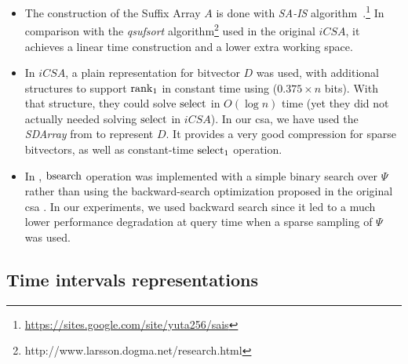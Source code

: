 	\begin{itemize}
		\item The construction of the Suffix Array $A$ is done with 
		{\em SA-IS} algorithm~\cite{nong2011two}.\footnote{\url{ https://sites.google.com/site/yuta256/sais}} 
		In comparison with the  {\em qsufsort} algorithm\footnote{
			http://www.larsson.dogma.net/research.html}
		\cite{Larsson:2007:FSS:1314704.1314853} used in the original $iCSA$, it achieves a linear time construction 
		and a lower extra working space. 
		
		\item In  $iCSA$, a plain representation for bitvector $D$ was used, with additional structures to support
		$\operatorname{rank}_1$ in constant time using ($0.375\times n$ bits). With that structure, they could solve $\operatorname{select}$ in $O(\log n)$ time (yet 
		they did not actually needed solving $\operatorname{select}$ in $iCSA$).
		In our \gls{csa}, we have used the {\em SDArray} from \cite{okanohara2007practical} to represent $D$. It provides a very 
		good compression for sparse bitvectors, as well as constant-time $\operatorname{select}_1$ operation.
		
		\item In \cite{FBNCPR12}, $\operatorname{bsearch}$ operation was implemented with a simple binary search over $\Psi$ rather than
		using the backward-search optimization proposed in the original \gls{csa} \cite{Sad03}. In our experiments, we used
		backward search since it led to a much lower performance degradation at query time when a sparse sampling of $\Psi$ 
		was used.
		
	\end{itemize}

	\subsection{Time intervals representations}
	\label{sec:time_repr}

